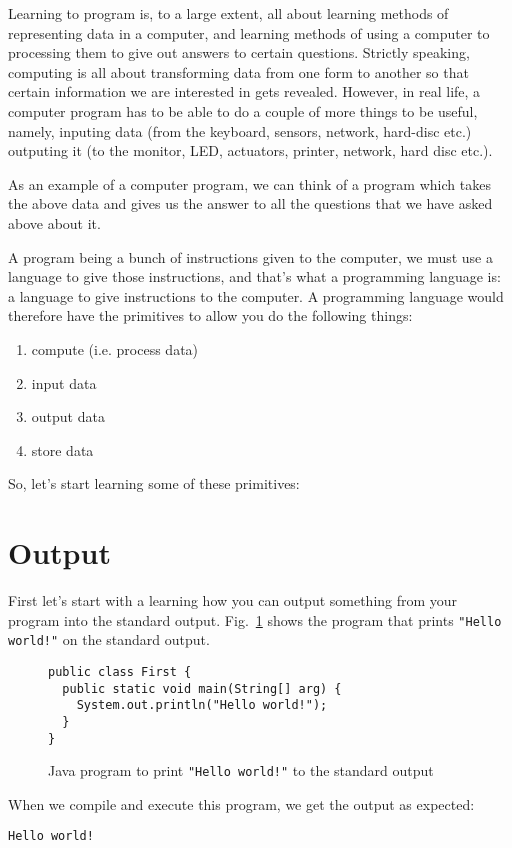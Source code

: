 \documentclass[12pt,a4paper]{article}
\begin{document}
Learning to program is, to a large extent, all about learning methods of representing data in a computer, and learning methods of using a computer to processing them to give out answers to certain questions. Strictly speaking, computing is all about transforming data from one form to another so that certain information we are interested in gets revealed. However, in real life, a computer program has to be able to do a couple of more things to be useful, namely, inputing data (from the keyboard, sensors, network, hard-disc etc.) outputing it (to the monitor, LED, actuators, printer, network, hard disc etc.).

As an example of a computer program, we can think of a program which takes the above data and gives us the answer to all the questions that we have asked above about it.

A program being a bunch of instructions given to the computer, we must use a language to give those instructions, and that's what a programming language is: a language to give instructions to the computer. A programming language would therefore have the primitives to allow you do the following things:
\begin{enumerate}
	\item compute (i.e. process data)
	\item input data
	\item output data
	\item store data
\end{enumerate}

So, let's start learning some of these primitives:

\section{Output}
First let's start with a learning how you can output something from your program into the standard output. Fig.~\ref{f:hw} shows the program that prints \texttt{"Hello world!"} on the standard output.

\begin{figure}[H]
\begin{lstlisting}[frame=single]
public class First {
  public static void main(String[] arg) {
    System.out.println("Hello world!");
  }
}
\end{lstlisting}
\caption{Java program to print \texttt{"Hello world!"} to the standard output}
\label{f:hw}
\end{figure}

When we compile and execute this program, we get the output as expected:
\begin{lstlisting}[frame=single]
Hello world!
\end{lstlisting}
\end{document}
